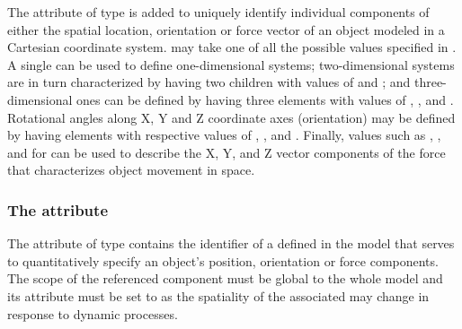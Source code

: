 The attribute  of type  is added to uniquely identify individual components of either the spatial location, orientation or force vector of an object modeled in a Cartesian coordinate system.  may take one of all the possible  values specified in . A single  \SpatialComponent can be used to define one-dimensional systems; two-dimensional systems are in turn characterized by having two \SpatialComponent children with  values of  and ; and three-dimensional ones can be defined by having three \SpatialComponent elements with  values of , , and . Rotational angles along X, Y and Z coordinate axes (orientation) may be defined by having \SpatialComponent elements with respective  values of , , and . Finally, values such as , , and  for  can be used to describe the X, Y, and Z vector components of the force that characterizes object movement in space.
 
\subsubsection{The  attribute}
\label{attr:variable}

The  attribute of type  contains the identifier of a \Parameter defined in the model that serves to quantitatively specify an object's position, orientation or force components. The scope of the referenced \Parameter component must be global to the whole model and its  attribute must be set to  as the spatiality of the associated \Compartment may change in response to dynamic processes.
